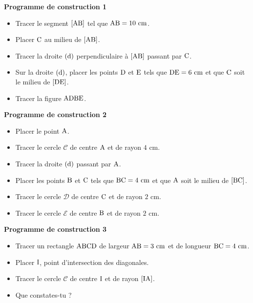 \documentclass{article}
\begin{document}
\noindent\textbf{Programme de construction 1}\par\smallskip\noindent
\begin{itemize}
    \item Tracer le segment $[\text{AB}]$ tel que
    $\text{AB}=10\text{ cm}$.
    \item Placer $\text{C}$ au milieu de $[\text{AB}]$.
    \item Tracer la droite $(\text{d})$ perpendiculaire à
    $[\text{AB}]$ passant par $\text{C}$.
    \item Sur la droite $(\text{d})$, placer les points
    $\text{D}$ et $\text{E}$ tels que
    $\text{DE}=6\text{ cm}$ et que $\text{C}$ soit le
    milieu de $[\text{DE}]$.
    \item Tracer la figure $\text{ADBE}$.
\end{itemize}
\noindent\textbf{Programme de construction 2}\par\smallskip\noindent
\begin{itemize}
    \item Placer le point $\text{A}$.
    \item Tracer le cercle $\mathcal{C}$ de centre $\text{A}$ et de
    rayon $4\text{ cm}$.
    \item Tracer la droite $(\text{d})$ passant par $\text{A}$.
    \item Placer les points $\text{B}$ et $\text{C}$ tels que
    $\text{BC}=4\text{ cm}$ et que $\text{A}$ soit le milieu
    de $[\text{BC}]$.
    \item Tracer le cercle $\mathcal{D}$ de centre $\text{C}$ et de
    rayon $2\text{ cm}$.
    \item Tracer le cercle $\mathcal{E}$ de centre $\text{B}$ et de
    rayon $2\text{ cm}$.
\end{itemize}
\noindent\textbf{Programme de construction 3}\par\smallskip\noindent
\begin{itemize}
    \item Tracer un rectangle $\text{ABCD}$ de largeur
    $\text{AB}=3\text{ cm}$ et de longueur $\text{BC}=4\text{ cm}$.
    \item Placer $\text{I}$, point d'intersection des diagonales.
    \item Tracer le cercle $\mathcal{C}$ de centre $\text{I}$ et de
    rayon $[\text{IA}]$.
    \item Que constates-tu ?
\end{itemize}
\end{document}
